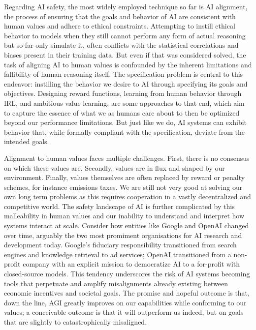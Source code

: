 Regarding \gls{AI} safety, the most widely employed technique so far is \gls{AI} alignment, the process of ensuring that the goals and behavior of \gls{AI} are consistent with human values and adhere to ethical constraints.
Attempting to instill ethical behavior to models when they still cannot perform any form of actual reasoning but so far only simulate it, often conflicts with the statistical correlations and biases present in their training data.
But even if that was considered solved, the task of aligning AI to human values is confounded by the inherent limitations and fallibility of human reasoning itself.
The specification problem is central to this endeavor: instilling the behavior we desire to \gls{AI} through specifying its goals and objectives.
Designing reward functions, learning from human behavior through \gls{IRL}, and ambitious value learning, are some approaches to that end, which aim to capture the essence of what we as humans care about to then be optimized beyond our performance limitations.
But just like we do, AI systems can exhibit behavior that, while formally compliant with the specification, deviate from the intended goals. 

Alignment to human values faces multiple challenges.
First, there is no consensus on which these values are.
Secondly, values are in flux and shaped by our environment.
Finally, values themselves are often replaced by reward or penalty schemes, for instance emissions taxes.
We are still not very good at solving our own long term problems as this requires cooperation in a vastly decentralized and competitive world.
The safety landscape of \gls{AI} is further complicated by this malleability in human values and our inability to understand and interpret how systems interact at scale.
Consider how entities like Google and OpenAI changed over time, arguably the two most promiment organisations for \gls{AI} research and development today.
Google's fiduciary responsibility transitioned from search engines and knowledge retrieval to ad services; OpenAI transitioned from a non-profit company with an explicit mission to democratize \gls{AI} to a for-profit with closed-source models.
This tendency underscores the risk of AI systems becoming tools that perpetuate and amplify misalignments already existing between economic incentives and societal goals.
The promise and hopeful outcome is that, down the line, \gls{AGI} greatly improves on our capabilities while conforming to our values; a conceivable outcome is that it will outperform us indeed, but on goals that are slightly to catastrophically misaligned.

